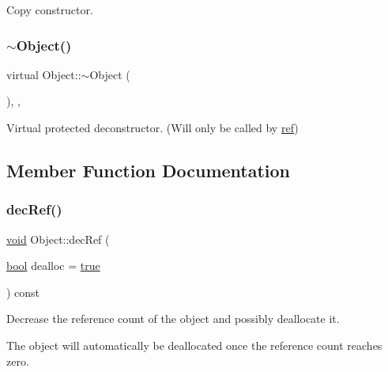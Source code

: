 Copy constructor. 

\mbox{\label{class_object_aa3e791419d84c4c346ef9499513b8e00}} 
\subsubsection{\texorpdfstring{$\sim$Object()}{~Object()}}
{\footnotesize\ttfamily virtual Object\+::$\sim$\+Object (\begin{DoxyParamCaption}{ }\end{DoxyParamCaption})\hspace{0.3cm}{\ttfamily [inline]}, {\ttfamily [protected]}, {\ttfamily [virtual]}}



Virtual protected deconstructor. (Will only be called by \mbox{\hyperlink{classref}{ref}}) 



\subsection{Member Function Documentation}
\mbox{\label{class_object_aee1171037ab2f9137ff9864ceb8f3086}} 
\subsubsection{\texorpdfstring{decRef()}{decRef()}}
{\footnotesize\ttfamily \mbox{\hyperlink{_s_d_l__opengles2__gl2ext_8h_ae5d8fa23ad07c48bb609509eae494c95}{void}} Object\+::dec\+Ref (\begin{DoxyParamCaption}\item[{\mbox{\hyperlink{asdl_8h_af6a258d8f3ee5206d682d799316314b1}{bool}}}]{dealloc = {\ttfamily \mbox{\hyperlink{asdl_8h_af6a258d8f3ee5206d682d799316314b1a08f175a5505a10b9ed657defeb050e4b}{true}}} }\end{DoxyParamCaption}) const\hspace{0.3cm}{\ttfamily [inline]}}



Decrease the reference count of the object and possibly deallocate it. 

The object will automatically be deallocated once the reference count reaches zero. \mbox{\label{class_object_a4f97f143f9fb46ac52e2f11cfa034005}} 
